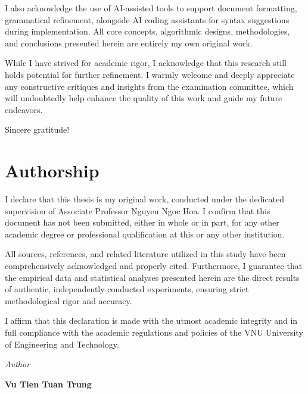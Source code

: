 \documentclass[12pt, a4paper, reqno, oneside]{book}
\begin{document}
I also acknowledge the use of AI-assisted tools to support document formatting, grammatical refinement, alongside AI coding assistants for syntax suggestions during implementation. All core concepts, algorithmic designs, methodologies, and conclusions presented herein are entirely my own original work.

While I have strived for academic rigor, I acknowledge that this research still holds potential for further refinement. I warmly welcome and deeply appreciate any constructive critiques and insights from the examination committee, which will undoubtedly help enhance the quality of this work and guide my future endeavors.

Sincere gratitude!

\newpage

\chapter*{Authorship}
\vspace{20pt}
I declare that this thesis is my original work, conducted under the dedicated supervision of Associate Professor Nguyen Ngoc Hoa. I confirm that this document has not been submitted, either in whole or in part, for any other academic degree or professional qualification at this or any other institution.

All sources, references, and related literature utilized in this study have been comprehensively acknowledged and properly cited. Furthermore, I guarantee that the empirical data and statistical analyses presented herein are the direct results of authentic, independently conducted experiments, ensuring strict methodological rigor and accuracy.

I affirm that this declaration is made with the utmost academic integrity and in full compliance with the academic regulations and policies of the VNU University of Engineering and Technology.

\begin{flushright}
{\it Author}
\hskip 1.5cm\quad

\vskip 2cm
{\bf Vu Tien Tuan Trung }  \quad\ \quad
\end{flushright}
\newpage

\end{document}
